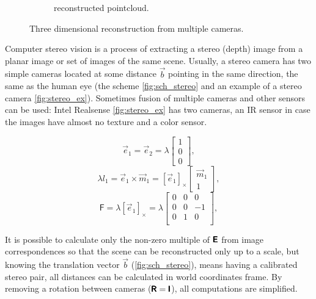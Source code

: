 \begin{figure}[h]
\begin{subfigure}[b]{0.65\textwidth}
      \caption{reconstructed pointcloud.}
      \label{fig:pc_output}
    \end{subfigure}
    \caption{Three dimensional reconstruction from multiple cameras.}
    \label{fig:pc_recons}
\end{figure}

Computer stereo vision is a process of extracting a stereo (depth) image from a planar image or set of images of the same scene. Usually, a stereo camera has two simple cameras located at some distance $\vec{b}$ pointing in the same direction, the same as the human eye (the scheme \autoref{fig:sch_stereo} and an example of a stereo camera \autoref{fig:stereo_ex}). 
Sometimes fusion of multiple cameras and other sensors can be used:
Intel Realsense \autoref{fig:stereo_ex} has two cameras, an IR sensor in case the images have almost no texture and a color sensor. 

\begin{equation}
    \label{eq:e1e2}
    \vec{e}_1 = \vec{e}_2 = \lambda \begin{bmatrix} 1 \\ 0 \\ 0 \end{bmatrix},
\end{equation}
\begin{equation}
    \label{eq:e1m1}
    \lambda l_1 = \vec{e}_1 \times \vec{m}_1 = [\vec{e}_1]_\times \begin{bmatrix} \vec{m}_1 \\ 1\end{bmatrix},
\end{equation}
\begin{equation}
    \label{eq:F_simple}
    \pmb{\mathsf{F}} = \lambda [\vec{e}_1]_\times = \lambda \begin{bmatrix}
        0 & 0 & 0 \\
        0 & 0 & -1 \\
        0 & 1 & 0 \\
    \end{bmatrix},
\end{equation}

It is possible to calculate only the non-zero multiple of $\pmb{\mathsf{E}}$ from image correspondences so that the scene can be reconstructed only up to a scale, but knowing the translation vector $\vec{b}$ (\autoref{fig:sch_stereo}), means having a calibrated stereo pair, all distances can be calculated in world coordinates frame.
By removing a rotation between cameras ($\pmb{\mathsf{R}} = \pmb{\mathsf{I}}$), all computations are simplified.

